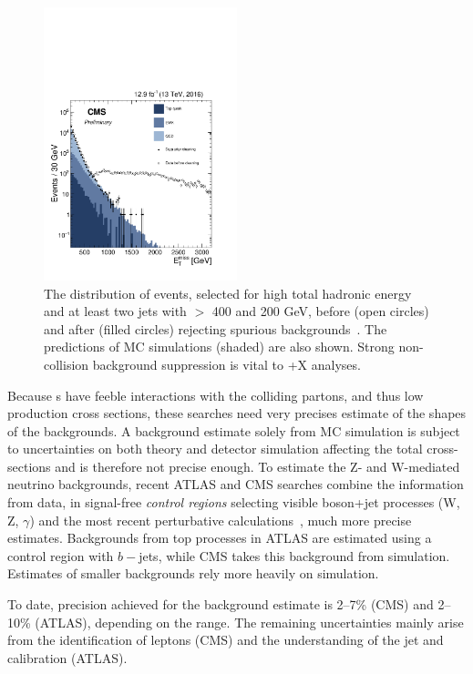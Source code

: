 \begin{figure}[!htpb]
\includegraphics[width=0.5\textwidth]{figures/FakeMET}
\caption{The \MET distribution of events, selected for high total hadronic energy and at least two jets with \pt{} $>$ 400 and 200 GeV, before (open circles) and after (filled circles) rejecting spurious \MET backgrounds~\cite{CMS-PAS-JME-16-004}. The predictions of MC simulations (shaded) are also shown.
Strong non-collision background suppression is vital to \MET+X analyses.}
\label{fig:fakeMET}
\end{figure}

Because {\IP}s have feeble interactions with the colliding partons, and thus low production cross sections, these searches need very precises estimate of the shapes of the backgrounds.
A background estimate solely from MC simulation is subject to uncertainties on both theory and detector simulation affecting the total cross-sections and is therefore not precise enough.
To estimate the Z- and W-mediated neutrino backgrounds, recent ATLAS and CMS searches combine the information from data, in signal-free \textit{control regions} selecting visible boson+jet processes (W, Z, $\gamma$) and the most recent perturbative calculations~\cite{Lindert:2017olm}, much more precise estimates.
Backgrounds from top processes in ATLAS are estimated using a control region with $b-$jets, while CMS takes this background from simulation.
Estimates of smaller backgrounds rely more heavily on simulation.

To date, precision achieved for the background estimate is 2--7\% (CMS) and 2--10\% (ATLAS), depending on the \MET range.
The remaining uncertainties mainly arise from the identification of leptons (CMS) and the understanding of the jet and \MET calibration (ATLAS). 

